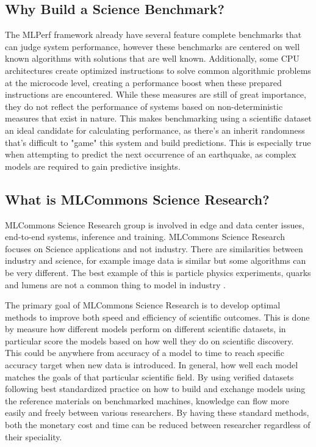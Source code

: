 \documentclass[sigplan,screen]{acmart}
\providecommand{\mlperf}{MLPerf}
\begin{document}
\subsection{Why Build a Science Benchmark?}

The \mlperf{} framework already have several feature complete
benchmarks that can judge system performance, however these benchmarks
are centered on well known algorithms with solutions that are well
known.  Additionally, some CPU architectures create optimized
instructions to solve common algorithmic problems at the microcode
level, creating a performance boost when these prepared instructions
are encountered\cite{cheong1997optimizer}.  While these measures are
still of great importance, they do not reflect the performance of
systems based on non-deterministic measures that exist in nature.
This makes benchmarking using a scientific dataset an ideal candidate
for calculating performance, as there's an inherit randomness that's
difficult to "game" this system and build predictions.  This is
especially true when attempting to predict the next occurrence of an
earthquake, as complex models are required to gain predictive
insights\cite{www-murakami2021}.

\subsection{What is MLCommons Science Research?}

MLCommons Science Research group is involved in edge and data center
issues, end-to-end systems, inference and training. MLCommons Science
Research focuses on Science applications and not industry. There are
similarities between industry and science, for example image data is
similar but some algorithms can be very different. The best example of
this is particle physics experiments, quarks and lumens are not a
common thing to model in industry \cite{www-mlcommons-science}.

The primary goal of MLCommons Science Research is to develop optimal
methods to improve both speed and efficiency of scientific
outcomes. This is done by measure how different models perform on
different scientific datasets, in particular score the models based on
how well they do on scientific discovery. This could be anywhere from
accuracy of a model to time to reach specific accuracy target when new
data is introduced. In general, how well each model matches the goals
of that particular scientific field. By using verified datasets
following best standardized practice on how to build and exchange
models using the reference materials on benchmarked machines,
knowledge can flow more easily and freely between various
researchers. By having these standard methods, both the monetary cost
and time can be reduced between researcher regardless of their
speciality.
\end{document}

